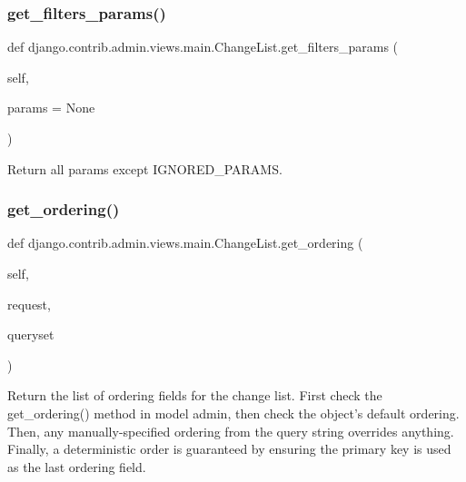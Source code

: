 \subsubsection{\texorpdfstring{get\+\_\+filters\+\_\+params()}{get\_filters\_params()}}
{\footnotesize\ttfamily def django.\+contrib.\+admin.\+views.\+main.\+Change\+List.\+get\+\_\+filters\+\_\+params (\begin{DoxyParamCaption}\item[{}]{self,  }\item[{}]{params = {\ttfamily None} }\end{DoxyParamCaption})}

\begin{DoxyVerb}Return all params except IGNORED_PARAMS.
\end{DoxyVerb}
 \mbox{\label{classdjango_1_1contrib_1_1admin_1_1views_1_1main_1_1_change_list_a3de9f22bbfde904010a35d6a15bd2ee7}} 
\subsubsection{\texorpdfstring{get\+\_\+ordering()}{get\_ordering()}}
{\footnotesize\ttfamily def django.\+contrib.\+admin.\+views.\+main.\+Change\+List.\+get\+\_\+ordering (\begin{DoxyParamCaption}\item[{}]{self,  }\item[{}]{request,  }\item[{}]{queryset }\end{DoxyParamCaption})}

\begin{DoxyVerb}Return the list of ordering fields for the change list.
First check the get_ordering() method in model admin, then check
the object's default ordering. Then, any manually-specified ordering
from the query string overrides anything. Finally, a deterministic
order is guaranteed by ensuring the primary key is used as the last
ordering field.
\end{DoxyVerb}
 \mbox{\label{classdjango_1_1contrib_1_1admin_1_1views_1_1main_1_1_change_list_ac19178d091fbcc66889d708a82dfdf96}} 
